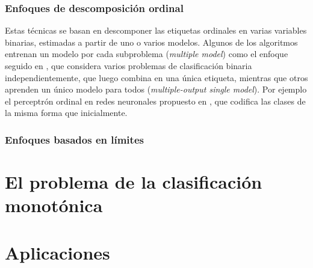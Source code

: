 \subsubsection{Enfoques de descomposición ordinal}
Estas técnicas se basan en descomponer las etiquetas ordinales en varias variables binarias, estimadas a partir de uno o varios modelos. Algunos de los algoritmos entrenan un modelo por cada subproblema (\textit{multiple model}) como el enfoque seguido en \cite{Hall}, que considera varios problemas de clasificación binaria independientemente, que luego combina en una única etiqueta, mientras que otros aprenden un único modelo para todos (\textit{multiple-output single model}). Por ejemplo el perceptrón ordinal en redes neuronales propuesto en \cite{cheng2008neural}, que codifica las clases de la misma forma que \cite{Hall} inicialmente.
\subsubsection{Enfoques basados en límites}

\section{El problema de la clasificación monotónica}

\section{Aplicaciones}